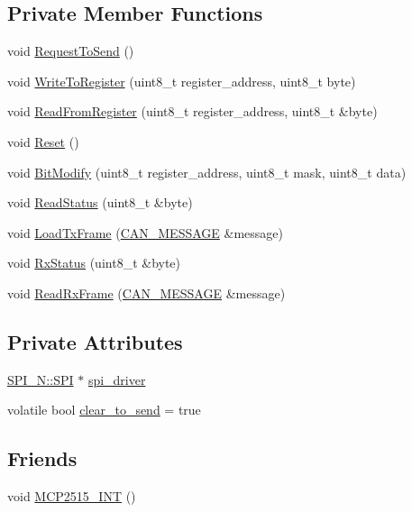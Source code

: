 \subsection*{Private Member Functions}
\begin{DoxyCompactItemize}
\item 
void \hyperlink{class_m_c_p2515_a5a218199ca1dfcb25cb95890bc0220fc}{Request\+To\+Send} ()
\item 
void \hyperlink{class_m_c_p2515_adbc005a5975b77b0aef74363f3832f9b}{Write\+To\+Register} (uint8\+\_\+t register\+\_\+address, uint8\+\_\+t byte)
\item 
void \hyperlink{class_m_c_p2515_a09ef6973daccbf868d89986e727cfa1b}{Read\+From\+Register} (uint8\+\_\+t register\+\_\+address, uint8\+\_\+t \&byte)
\item 
void \hyperlink{class_m_c_p2515_aa4d4138b984dc87116cf72ae104acb70}{Reset} ()
\item 
void \hyperlink{class_m_c_p2515_aa9a35fe139adf1fccaaceec561544c14}{Bit\+Modify} (uint8\+\_\+t register\+\_\+address, uint8\+\_\+t mask, uint8\+\_\+t data)
\item 
void \hyperlink{class_m_c_p2515_ae466f10eea5ccf0f36439757d4baf6b5}{Read\+Status} (uint8\+\_\+t \&byte)
\item 
void \hyperlink{class_m_c_p2515_a37771e54c401a0d11b16599f4a3b85df}{Load\+Tx\+Frame} (\hyperlink{struct_c_a_n___m_e_s_s_a_g_e}{C\+A\+N\+\_\+\+M\+E\+S\+S\+A\+GE} \&message)
\item 
void \hyperlink{class_m_c_p2515_af6853f82074a0be19d5a0516a959515e}{Rx\+Status} (uint8\+\_\+t \&byte)
\item 
void \hyperlink{class_m_c_p2515_a2035c6707e66a98d92003a3fc99aa784}{Read\+Rx\+Frame} (\hyperlink{struct_c_a_n___m_e_s_s_a_g_e}{C\+A\+N\+\_\+\+M\+E\+S\+S\+A\+GE} \&message)
\end{DoxyCompactItemize}
\subsection*{Private Attributes}
\begin{DoxyCompactItemize}
\item 
\hyperlink{class_s_p_i___n_1_1_s_p_i}{S\+P\+I\+\_\+\+N\+::\+S\+PI} $\ast$ \hyperlink{class_m_c_p2515_a3a5ca0d606115f1551a06d871606540e}{spi\+\_\+driver}
\item 
volatile bool \hyperlink{class_m_c_p2515_a1418f0f66d9a57659809192552d5ac37}{clear\+\_\+to\+\_\+send} = true
\end{DoxyCompactItemize}
\subsection*{Friends}
\begin{DoxyCompactItemize}
\item 
void \hyperlink{class_m_c_p2515_a3e97befdad3bb95f1da9cf6ff507febe}{M\+C\+P2515\+\_\+\+I\+NT} ()
\end{DoxyCompactItemize}
